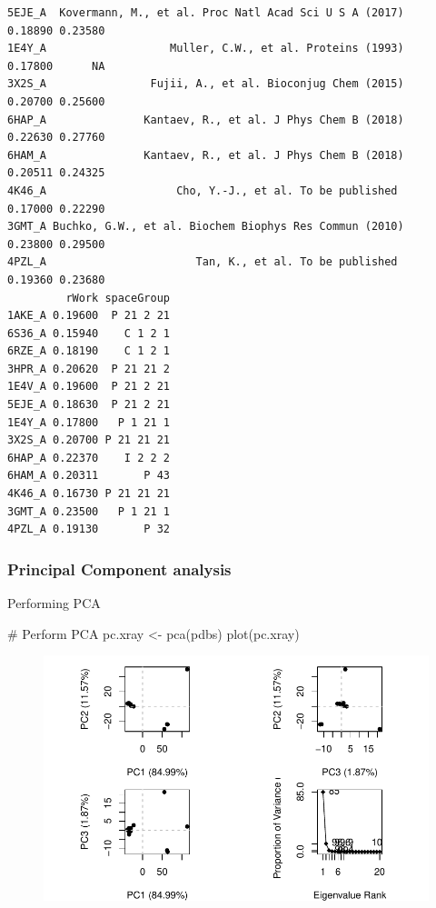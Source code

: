 \documentclass[
  letterpaper,
  DIV=11,
  numbers=noendperiod]{scrartcl}
\newenvironment{Shaded}{\begin{snugshade}}{\end{snugshade}}
\newcommand{\CommentTok}[1]{\textcolor[rgb]{0.37,0.37,0.37}{#1}}
\newcommand{\FunctionTok}[1]{\textcolor[rgb]{0.28,0.35,0.67}{#1}}
\newcommand{\NormalTok}[1]{\textcolor[rgb]{0.00,0.23,0.31}{#1}}
\newcommand{\OtherTok}[1]{\textcolor[rgb]{0.00,0.23,0.31}{#1}}
\begin{document}
\begin{verbatim}
5EJE_A  Kovermann, M., et al. Proc Natl Acad Sci U S A (2017)   0.18890 0.23580
1E4Y_A                   Muller, C.W., et al. Proteins (1993)   0.17800      NA
3X2S_A                Fujii, A., et al. Bioconjug Chem (2015)   0.20700 0.25600
6HAP_A               Kantaev, R., et al. J Phys Chem B (2018)   0.22630 0.27760
6HAM_A               Kantaev, R., et al. J Phys Chem B (2018)   0.20511 0.24325
4K46_A                    Cho, Y.-J., et al. To be published    0.17000 0.22290
3GMT_A Buchko, G.W., et al. Biochem Biophys Res Commun (2010)   0.23800 0.29500
4PZL_A                       Tan, K., et al. To be published    0.19360 0.23680
         rWork spaceGroup
1AKE_A 0.19600  P 21 2 21
6S36_A 0.15940    C 1 2 1
6RZE_A 0.18190    C 1 2 1
3HPR_A 0.20620  P 21 21 2
1E4V_A 0.19600  P 21 2 21
5EJE_A 0.18630  P 21 2 21
1E4Y_A 0.17800   P 1 21 1
3X2S_A 0.20700 P 21 21 21
6HAP_A 0.22370    I 2 2 2
6HAM_A 0.20311       P 43
4K46_A 0.16730 P 21 21 21
3GMT_A 0.23500   P 1 21 1
4PZL_A 0.19130       P 32
\end{verbatim}

\hypertarget{principal-component-analysis}{%
\subsubsection{Principal Component
analysis}\label{principal-component-analysis}}

Performing PCA

\begin{Shaded}
\begin{Highlighting}[]
\CommentTok{\# Perform PCA}
\NormalTok{pc.xray }\OtherTok{\textless{}{-}} \FunctionTok{pca}\NormalTok{(pdbs)}
\FunctionTok{plot}\NormalTok{(pc.xray)}
\end{Highlighting}
\end{Shaded}

\begin{figure}[H]

{\centering \includegraphics{class09_files/figure-pdf/unnamed-chunk-15-1.pdf}

}

\end{figure}
\end{document}

